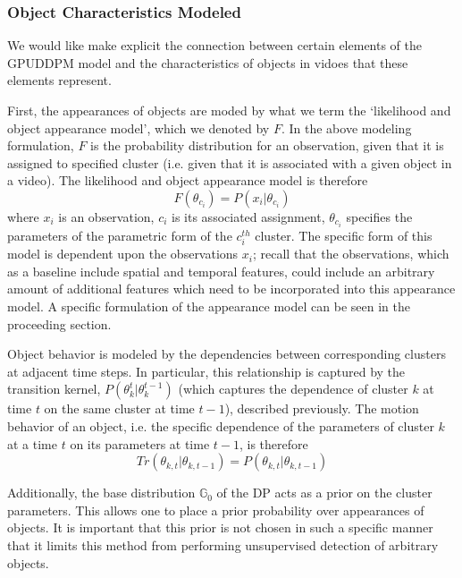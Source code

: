 \documentclass[smallcondensed, final]{svjour3}
\begin{document}
\subsubsection{Object Characteristics Modeled}

We would like make explicit the connection between certain elements of the GPUDDPM model and the characteristics of objects in vidoes that these elements represent.

First, the appearances of objects are moded by what we term the `likelihood and object appearance model', which we denoted by $F$. In the above modeling formulation, $F$ is the probability distribution for an observation, given that it is assigned to specified cluster (i.e. given that it is associated with a given object in a video). The likelihood and object appearance model is therefore
\begin{equation}
F(\theta_{c_{i}}) = P(x_{i}|\theta_{c_{i}})
\end{equation}
where $x_{i}$ is an observation, $c_{i}$ is its associated assignment, $\theta_{c_{i}}$ specifies the parameters of the parametric form of the $c_{i}^{th}$ cluster. The specific form of this model is dependent upon the observations $x_{i}$; recall that the observations, which as a baseline include spatial and temporal features, could include an arbitrary amount of additional features which need to be incorporated into this appearance model. A specific formulation of the appearance model can be seen in the proceeding section.

Object behavior is modeled by the dependencies between corresponding clusters at adjacent time steps. In particular, this relationship is captured by the transition kernel, $P(\theta_{k}^{t} | \theta_{k}^{t-1})$ (which captures the dependence of cluster $k$ at time $t$ on the same cluster at time $t-1$), described previously. The motion behavior of an object, i.e. the specific dependence of the parameters of cluster $k$ at a time $t$ on its parameters at time $t-1$, is therefore
\begin{equation}
Tr(\theta_{k, t} | \theta_{k, t-1}) = P(\theta_{k, t} | \theta_{k, t-1})
\end{equation}

Additionally, the base distribution $\mathbb{G}_{0}$ of the DP acts as a prior on the cluster parameters. This allows one to place a prior probability over appearances of objects. It is important that this prior is not chosen in such a specific manner that it limits this method from performing unsupervised detection of arbitrary objects.
\end{document}
